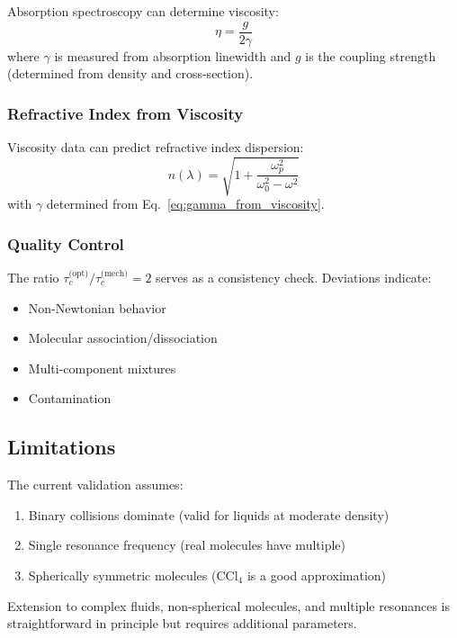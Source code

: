 \documentclass[twocolumn,10pt]{article}
\theoremstyle{definition}
\theoremstyle{remark}
\begin{document}
Absorption spectroscopy can determine viscosity:
\begin{equation}
\eta = \frac{g}{2\gamma}
\end{equation}
where $\gamma$ is measured from absorption linewidth and $g$ is the coupling strength (determined from density and cross-section).

\subsubsection{Refractive Index from Viscosity}

Viscosity data can predict refractive index dispersion:
\begin{equation}
n(\lambda) = \sqrt{1 + \frac{\omega_p^2}{\omega_0^2 - \omega^2}}
\end{equation}
with $\gamma$ determined from Eq.~\eqref{eq:gamma_from_viscosity}.

\subsubsection{Quality Control}

The ratio $\tau_c^{\text{(opt)}}/\tau_c^{\text{(mech)}} = 2$ serves as a consistency check. Deviations indicate:
\begin{itemize}
\item Non-Newtonian behavior
\item Molecular association/dissociation
\item Multi-component mixtures
\item Contamination
\end{itemize}

\subsection{Limitations}

The current validation assumes:
\begin{enumerate}
\item Binary collisions dominate (valid for liquids at moderate density)
\item Single resonance frequency (real molecules have multiple)
\item Spherically symmetric molecules (CCl$_4$ is a good approximation)
\end{enumerate}

Extension to complex fluids, non-spherical molecules, and multiple resonances is straightforward in principle but requires additional parameters.
\end{document}
